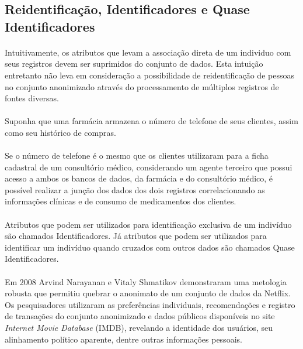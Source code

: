 \subsection{Reidentificação, Identificadores e Quase Identificadores}

\paragraph{} Intuitivamente, os atributos que levam a associação direta de um individuo com seus registros devem ser suprimidos do conjunto de dados. Esta intuição entretanto não leva em consideração a possibilidade de reidentificação de pessoas no conjunto anonimizado através do processamento de múltiplos registros de fontes diversas. 

\paragraph{} Suponha que uma farmácia armazena o número de telefone 
de seus clientes, assim como seu histórico de compras. 

\paragraph{} Se o número de telefone é o mesmo que os clientes utilizaram para a ficha cadastral de um consultório médico, considerando um agente terceiro que possui acesso a ambos os bancos de dados, da farmácia e do 
consultório médico, é possível realizar a junção dos dados dos dois registros correlacionando as informações clínicas e de consumo de medicamentos dos clientes.

\paragraph{} Atributos que podem ser utilizados para identificação exclusiva de um indivíduo são chamados Identificadores. Já  atributos que podem ser utilizados para identificar um indivíduo quando cruzados com outros dados são chamados Quase Identificadores.

\paragraph{} Em 2008 Arvind Narayanan e Vitaly Shmatikov demonstraram uma metologia robusta\cite{netflixDeanon}  que permitiu quebrar o anonimato de um conjunto de dados da Netflix. Os pesquisadores utilizaram as preferências individuais, recomendações e registro de transações do conjunto anonimizado e dados públicos disponíveis no site \textit{Internet Movie Database} (IMDB), revelando a identidade dos usuários, seu alinhamento político aparente, dentre outras informações pessoais.

